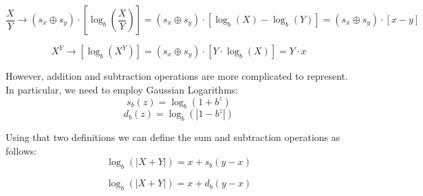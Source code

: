 \begin{equation}
    \frac{X}{Y} \xrightarrow[]{} (s_x \oplus s_y)\cdot \left[ \log_b\left(\frac{X}{Y}\right) \right] = (s_x \oplus s_y)\cdot \left[ \log_b(X) -  \log_b(Y) \right] = (s_x \oplus s_y)\cdot \left[ x-y \right]
\end{equation}

\begin{equation}
    X^Y \xrightarrow[]{} \left[ \log_b(X ^ Y) \right] = (s_x \oplus s_y)\cdot \left[Y \cdot  \log_b(X)  \right] = Y\cdot x
\end{equation}

However, addition and subtraction operations are more complicated to represent. In particular, we need to employ Gaussian Logarithms:
\begin{equation}
    s_b(z) = \log_b (1 + b^z)
\end{equation}
\begin{equation}
    d_b(z) = \log_b (\left | 1 - b^z \right |)
\end{equation}

Using that two definitions we can define the sum and subtraction operations as follows:
\begin{equation}
    \log_b(|X + Y|) = x + s_b(y - x) 
\end{equation}

\begin{equation}
    \log_b(|X + Y|) = x + d_b(y - x) 
\end{equation}



